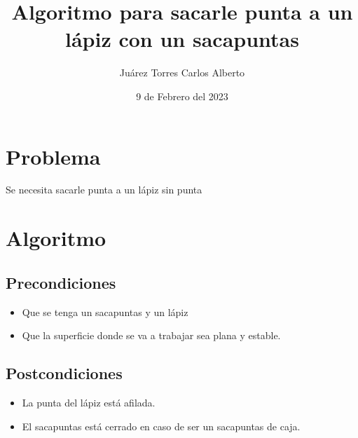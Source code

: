 \documentclass{article}
\title{Algoritmo para sacarle punta a un lápiz con un sacapuntas}
\author{Juárez Torres Carlos Alberto}
\date{9 de Febrero del 2023}
\begin{document}
\maketitle

\section*{Problema}
Se necesita sacarle punta a un lápiz sin punta
\section*{Algoritmo}
\subsection*{Precondiciones}
\begin{itemize}
    \item Que se tenga un sacapuntas y un lápiz
    \item Que la superficie donde se va a trabajar sea plana y estable.
\end{itemize}
\subsection*{Postcondiciones}
\begin{itemize}
    \item La punta del lápiz está afilada.
    \item El sacapuntas está cerrado en caso de ser un sacapuntas de caja.
\end{itemize}
\end{document}
